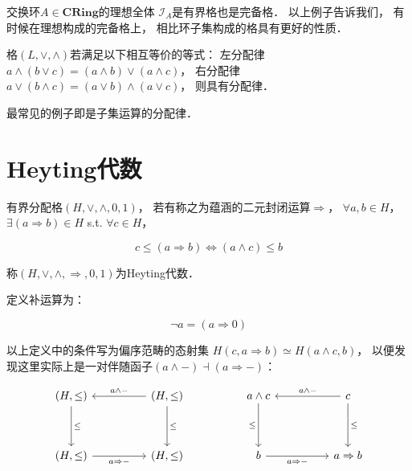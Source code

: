 交换环$A\in\textbf{CRing}$的理想全体
$\mathcal I_A$是有界格也是完备格．
以上例子告诉我们，
有时候在理想构成的完备格上，
相比环子集构成的格具有更好的性质．

\begin{framed}
格$(L,\vee,\wedge)$若满足以下相互等价的等式：
左分配律$a\wedge(b\vee c) = (a\wedge b) \vee (a\wedge c)$，
右分配律$a\vee(b\wedge c) = (a\vee b) \wedge (a\vee c)$，
则具有分配律．
\end{framed}

最常见的例子即是子集运算的分配律．

\section{Heyting代数}

\begin{framed}
有界分配格$(H,\vee,\wedge,0,1)$，
若有称之为蕴涵的二元封闭运算$\Rightarrow$，
$\forall a,b \in H$，
$\exists (a \Rightarrow b) \in H$
s.t. 
$\forall c \in H$，

$$
c \leq (a \Rightarrow b)
\Longleftrightarrow
(a \wedge c) \leq b
$$

称$(H,\vee,\wedge,\Rightarrow,0,1)$为Heyting代数．

定义补运算为：

$$
\neg a = (a \Rightarrow 0)
$$

\end{framed}

以上定义中的条件写为偏序范畴的态射集
$H(c,a \Rightarrow b) \simeq H(a \wedge c,b)$，
以便发现这里实际上是一对伴随函子$(a \wedge -) \dashv (a \Rightarrow -)$：

$$
\begin{tikzcd}
{(H,\leq)} \arrow[dd, "\leq"]             &  & {(H,\leq)} \arrow[dd, "\leq"] \arrow[ll, "a \wedge -"'] &  & a \wedge c \arrow[dd, "\leq"']   &  & c \arrow[ll, "a \wedge -"'] \arrow[dd, "\leq"] \\
                                          &  &                                                         &  &                                  &  &                                                \\
{(H,\leq)} \arrow[rr, "a \Rightarrow -"'] &  & {(H,\leq)}                                              &  & b \arrow[rr, "a \Rightarrow -"'] &  & a \Rightarrow b                               
\end{tikzcd}
$$

